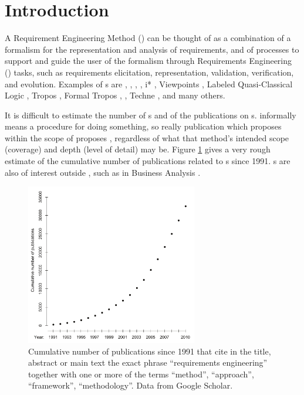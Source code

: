 \documentclass[10pt, final, conference, compsocconf]{IEEEtran}
\begin{document}
\section{Introduction}\label{s:introduction}
A Requirement Engineering Method () can be thought of as a combination of a formalism for the representation and analysis of requirements, and of processes to support and guide the user of the formalism through Requirements Engineering () tasks, such as requirements elicitation, representation, validation, verification, and evolution. Examples of s are  \cite{Greenspan:1984:PHD},  \cite{Dubois+:1988:PJR},  \cite{Mylopoulos+:1992:TSE},  \cite{Dardenne+:1993:SCP}, i* \cite{Yu+:1994:ICSE}, Viewpoints \cite{Finkelstein+:1994:TSE}, Labeled Quasi-Classical Logic \cite{Hunter+:1998:TOSEM}, Tropos \cite{Castro+:2002:IS}, Formal Tropos \cite{Fuxman+:2004:REJ},  \cite{Gervasi+:2005:TOSEM}, Techne \cite{Jureta+:2010:RE}, and many others. 

It is difficult to estimate the number of s and of the publications on s.  informally means a procedure for doing something, so really  publication which proposes  within the scope of  proposes  , regardless of what that method's intended scope (coverage) and depth (level of detail) may be. Figure \ref{f:cumulative-publications} gives a very rough estimate of the cumulative number of publications related to s since 1991. s are also of interest outside , such as in Business Analysis \cite{HP:2007,BABOK:2009}. 

\begin{figure}[b!]
\vspace{-8mm}
	\centering
	\includegraphics[width=7.5cm]{cumulative-publication-data}
\vspace{-3mm}
\caption{Cumulative number of publications since 1991 that cite in the title, abstract or main text the exact phrase ``requirements engineering'' together with one or more of the terms ``method'', ``approach'', ``framework'', ``methodology''. Data from Google Scholar.}
\label{f:cumulative-publications}
\end{figure}
\end{document}
